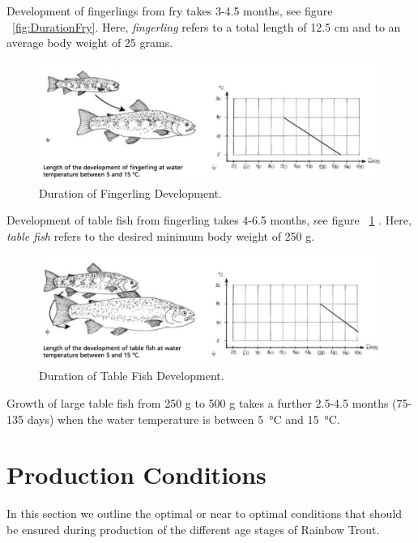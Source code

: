 Development of fingerlings from fry takes 3-4.5 months, see figure ~\ref{fig:DurationFry}. Here, {\it fingerling} refers to a total length of 12.5 cm and to an average body weight of 25 grams.

\begin{figure}[H]
   \centering
   \includegraphics[scale = 0.6]{images/DurationFingerlings.png}
    \caption{Duration of Fingerling Development.}
   \label{fig:DurationFingerlings}
\end{figure}

Development of table fish from fingerling takes 4-6.5 months,  see figure ~\ref{fig:DurationFingerlings} . Here, {\it table fish} refers to the desired minimum body weight of 250 g.

\begin{figure}[H]
   \centering
   \includegraphics[scale = 0.6]{images/DurationTableFish.png}
    \caption{Duration of Table Fish Development.}
   \label{fig:DurationTableFish}
\end{figure}

Growth of large table fish from 250 g to 500 g takes a further 2.5-4.5 months (75-135 days) when the water temperature is between  \SI{5}{\celsius} and  \SI{15}{\celsius}.



\section{Production Conditions}

In this section we outline the optimal or near to optimal conditions that should be ensured during production of the different age stages of Rainbow Trout. 

